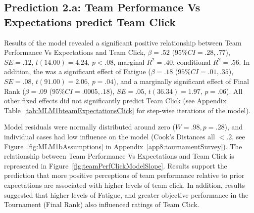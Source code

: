 \begin{CJK}{UTF8}{gbsn}
\subsection{Prediction 2.a: Team Performance Vs Expectations predict Team Click\label{sect:prediction1b}}

Results of the model revealed a significant positive relationship between Team Performance Vs Expectations and Team Click, $\beta = .52$ ($95\% CI =  .28, .77$), $SE = .12$, $t(14.00) = 4.24$, $p < .08$, marginal $R^2 = .40$, conditional $R^2 = .56$.  In addition, the was a significant effect of Fatigue ($\beta = .18$ ($95\% CI =  .01, .35$), $SE = .08$, $t(91.00) = 2.06$, $p = .04$), and a marginally significant effect of Final Rank ($\beta = .09$ ($95\% CI =  .0005, .18$), $SE = .05$, $t(36.34) = 1.97$, $p = .06$).  All other fixed effects did not significantly predict Team Click (see Appendix  Table~\ref{tab:MLM1bteamExpectationsClick} for step-wise iterations of the model).

Model residuals were normally distributed around zero ($W = .98, p = .28$), and individual cases had low influence on the model (Cook's Distances all $< .2$, see Figure~\ref{fig:MLM1bAssumptions} in Appendix~\ref{app8:tournamentSurvey}).  The relationship between Team Performance Vs Expectations and Team Click is represented in Figure~\ref{fig:teamPerfClickModelSlope}.  Results support the prediction that more positive perceptions of team performance relative to prior expectations are associated with higher levels of team click.   In addition, results suggested that higher levels of Fatigue, and greater objective performance in the Tournament (Final Rank) also influenced ratings of Team Click.



\end{CJK}
